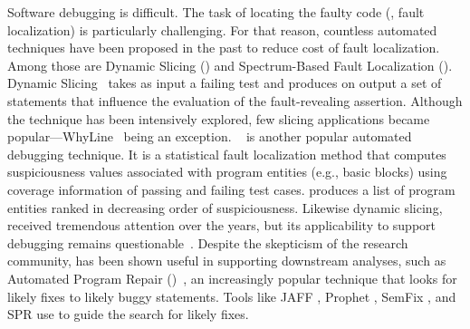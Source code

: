 \documentclass[sigplan,10pt,review,anonymous]{acmart}\settopmatter{printfolios=true,printccs=false,printacmref=false}
\begin{document}
Software debugging is difficult. The task of locating the faulty code
(\ie{}, fault localization) is particularly challenging. For that
reason, countless automated techniques have been proposed in the past
to reduce cost of fault localization. Among those are Dynamic Slicing
(\ds{}) and Spectrum-Based Fault Localization (\sfl{}). Dynamic
Slicing~\cite{Agrawal:1990:DPS:93542.93576} takes as input a failing
test and produces on output a set of statements that influence the
evaluation of the fault-revealing assertion.  Although the technique
has been intensively explored, few slicing applications became
popular---WhyLine~\cite{Ko:2008:DRA:1368088.1368130} being an
exception.  \sfl{}~\cite{7390282} is another popular automated
debugging technique. It is a statistical fault localization method
that computes suspiciousness values associated with program entities
(e.g., basic blocks) using coverage information of passing and failing
test cases. \sfl{} produces a list of program entities ranked in
decreasing order of suspiciousness.  Likewise dynamic slicing, \sfl{}
received tremendous attention over the years, but its applicability to
support debugging remains
questionable~\cite{ang-perez-van-deursen-rui-2017,Pearson:2017:EIF:3097368.3097441,Xie:2016:RAD:2884781.2884834}.
Despite the skepticism of the research community, \sfl{} has been
shown useful in supporting downstream analyses, such as Automated
Program Repair
(\apr{})~\cite{automatic-software-repair-survey2017,kim-etal-daghstul2017},
an increasingly popular technique that looks for likely fixes to
likely buggy statements.  Tools like JAFF \cite{arcuri-2011}, Prophet
\cite{long-rinard-2016}, SemFix \cite{nguyen-qi-roychoudhury-2013},
and SPR \cite{long-rinard-2015} use \sfl{} to guide the search for
likely fixes.


\end{document}
